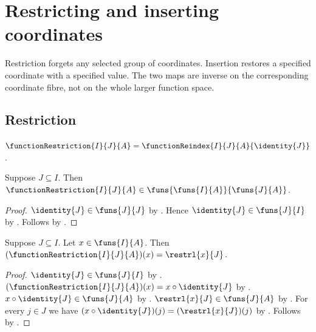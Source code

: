 \section{Restricting and inserting coordinates}




Restriction forgets any selected group of coordinates. Insertion restores a
specified coordinate with a specified value. The two maps are inverse on the
corresponding coordinate fibre, not on the whole larger function space.

\subsection{Restriction}

\begin{definition}\label{function_restriction}
    $\functionRestriction{I}{J}{A}=\functionReindex{I}{J}{A}{\identity{J}}$.
\end{definition}

\begin{proposition}\label{function_restriction_type}
    Suppose $J\subseteq I$.
    Then $\functionRestriction{I}{J}{A}\in\funs{\funs{I}{A}}{\funs{J}{A}}$.
\end{proposition}
\begin{proof}
    $\identity{J}\in\funs{J}{J}$ by .
    Hence $\identity{J}\in\funs{J}{I}$ by .
    Follows by .
\end{proof}

\begin{proposition}\label{function_restriction_apply}
    Suppose $J\subseteq I$.
    Let $x\in\funs{I}{A}$.
    Then $(\functionRestriction{I}{J}{A})(x)=\restrl{x}{J}$.
\end{proposition}
\begin{proof}
    $\identity{J}\in\funs{J}{I}$ by .
    $(\functionRestriction{I}{J}{A})(x)=x\circ\identity{J}$ by
        .
    $x\circ\identity{J}\in\funs{J}{A}$ by .
    $\restrl{x}{J}\in\funs{J}{A}$ by .
    For every $j\in J$ we have $(x\circ\identity{J})(j)=(\restrl{x}{J})(j)$ by
        .
    Follows by .
\end{proof}

